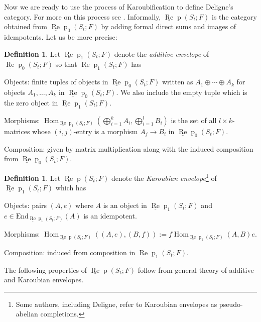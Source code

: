 \documentclass{amsart}
\theoremstyle{definition}
\newtheorem{definition}[theorem]{Definition}
\newcommand{\End}{\text{End}}
\newcommand{\Hom}{\operatorname{Hom}}
\def\uRep{\underline{\operatorname{Re}}\!\operatorname{p}}
\renewcommand{\1}{_{(1)}}
\renewcommand{\2}{_{(2)}}
\newcommand{\3}{_{(3)}}
\newcommand{\4}{_{(4)}}
\begin{document}
Now we are ready to use the process of Karoubification to define Deligne's category.  For more on this process see \cite[1.7-8]{Del07}.  Informally, $ \uRep(S_t; F)$ is the category obtained from $\uRep_0(S_t; F)$ by adding formal direct sums and images of idempotents.  Let us be more precise:

\begin{definition} Let $\uRep_1(S_t; F)$ denote the \emph{additive envelope} of $\uRep_0(S_t; F)$ so that $\uRep_1(S_t; F)$ has 

Objects:  finite tuples of objects in $\uRep_0(S_t; F)$ written as $A_1\oplus\cdots\oplus A_k$ for objects $A_1,\ldots, A_k$ in $\uRep_0(S_t; F)$.  We also include the empty tuple which is the zero object in $\uRep_1(S_t; F)$.

Morphisms:  $\Hom_{\uRep_1(S_t; F)}\left(\bigoplus_{i=1}^kA_i, \bigoplus_{i=1}^lB_i\right)$ is the set of all $l\times k$-matrices whose $(i,j)$-entry is a morphism $A_j\to B_i$ in $\uRep_0(S_t; F)$.  

Composition: given by matrix multiplication along with the induced composition from $\uRep_0(S_t; F)$.

\end{definition}


\begin{definition} Let $\uRep(S_t; F)$ denote the \emph{Karoubian envelope}\footnote{Some authors, including Deligne, refer to Karoubian envelopes as pseudo-abelian completions.} of $\uRep_1(S_t; F)$ which has 

Objects: pairs $(A, e)$ where $A$ is an object in $\uRep_1(S_t; F)$ and $e\in\End_{\uRep_1(S_t; F)}(A)$ is an idempotent.

Morphisms:  $\Hom_{\uRep(S_t; F)}\left((A,e), (B,f)\right):=f\Hom_{\uRep_1(S_t; F)}(A, B)e$.  

Composition: induced from composition in $\uRep_1(S_t; F)$.

\end{definition}

The following properties of $\uRep(S_t; F)$ follow from general theory of additive and Karoubian envelopes.
\end{document}
